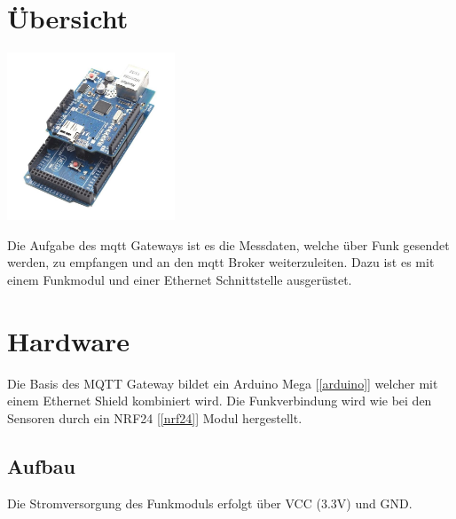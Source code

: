 \documentclass[
  12pt, %
  a4paper, %
  oneside, %
  openany, 
  numbers=noenddot, %
  BCOR=5mm, %
  parskip=half*, %
  thesis, %
]{bfhbook}
\begin{document}
\section{Übersicht}
\begin{center}
    \begin{minipage}[t]{0.3\textwidth}
\includegraphics[width=5cm, left, valign=t]{Bilder/ArduinoWithEthernetShield.jpg}
	\end{minipage}\hfill
    \begin{minipage}[t]{0.7\textwidth}
    Die Aufgabe des \Gls{mqtt} Gateways ist es die Messdaten, welche über Funk gesendet werden, zu empfangen und an den \Gls{mqtt} Broker weiterzuleiten. Dazu ist es mit einem Funkmodul und einer Ethernet Schnittstelle ausgerüstet.
    \end{minipage}
\end{center}

\section{Hardware}
Die Basis des MQTT Gateway bildet ein Arduino Mega [\ref{arduino}] welcher mit einem Ethernet Shield kombiniert wird. Die Funkverbindung wird wie bei den Sensoren durch ein NRF24 [\ref{nrf24}] Modul hergestellt.
\subsection{Aufbau}
Die Stromversorgung des Funkmoduls erfolgt über VCC (3.3V) und GND. 
\end{document}
